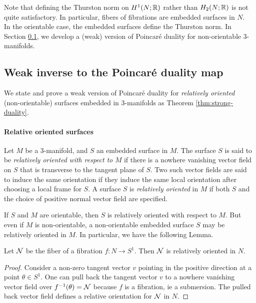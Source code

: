 Note that defining the Thurston norm on $H^1(N; \mathbb{R})$ rather than $H_2(N; \mathbb{R})$ is not quite satisfactory.
In particular, fibers of fibrations are embedded surfaces in $N$.  In the orientable case, the embedded surfaces define the Thurston norm.
In Section \ref{sec:weak-inverse-poinc}, we develop a (weak) version of Poincar\'e duality for non-orientable 3-manifolds.

\subsection{Weak inverse to the Poincar\'e duality map}
\label{sec:weak-inverse-poinc}

We state and prove a weak version of Poincar\'e duality for {\it relatively oriented} (non-orientable) surfaces embedded in 3-manifolds as Theorem \ref{thm:strong-duality}.

\paragraph{Relative oriented surfaces}
  Let $M$ be a $3$-manifold, and $S$ an embedded surface in $M$.
  The surface $S$ is said to be \emph{relatively oriented with respect to $M$} if there is a nowhere vanishing vector field on $S$ that is transverse to the tangent plane of $S$.
  Two such vector fields are said to induce the same orientation if they induce the same local orientation after choosing a local frame for $S$.
  A surface $S$ is \emph{relatively oriented} in $M$ if both $S$ and the choice of positive normal vector field are specified.

If $S$ and $M$ are orientable, then $S$ is relatively oriented with respect to $M$.
But even if $M$ is non-orientable, a non-orientable embedded surface $S$ may be relatively oriented in $M$.  In particular, we have the following Lemma.
\begin{lem}
  \label{lem:fibers-relatively-oriented}
  Let $\mathcal{N}$ be the fiber of a fibration $f: N \to S^1$.
  Then $\mathcal{N}$ is relatively oriented in $N$.
\end{lem}
\begin{proof}
Consider a non-zero tangent vector $v$ pointing in the positive direction at a point $\theta \in S^1$.
One can pull back the tangent vector $v$ to a nowhere vanishing vector field over $f^{-1}(\theta) = \mathcal{N}$ because $f$ is a fibration, ie a submersion.
The pulled back vector field defines a relative orientation for $\mathcal{N}$ in $N$.
\end{proof}

